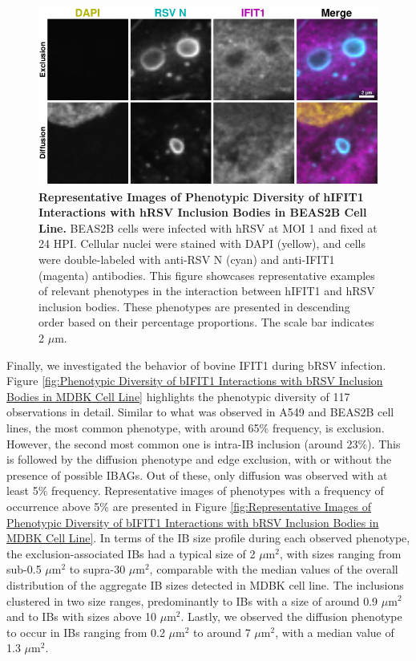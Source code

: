 \begin{figure}
    \centering
    \includegraphics[width=1\linewidth]{08. Chapter 3/Figs/02. Infection/01. IFIT1/06. beas2b i1.pdf}
    \caption[Representative Images of Phenotypic Diversity of hIFIT1 Interactions with hRSV Inclusion Bodies in BEAS2B Cell Line.]{\textbf{Representative Images of Phenotypic Diversity of hIFIT1 Interactions with hRSV Inclusion Bodies in BEAS2B Cell Line.} BEAS2B cells were infected with hRSV at MOI 1 and fixed at 24 HPI. Cellular nuclei were stained with DAPI (yellow), and cells were double-labeled with anti-RSV N (cyan) and anti-IFIT1 (magenta) antibodies. This figure showcases representative examples of relevant phenotypes in the interaction between hIFIT1 and hRSV inclusion bodies. These phenotypes are presented in descending order based on their percentage proportions. The scale bar indicates 2 \(\mu \mbox{m}\).}
    \label{fig:Representative Images of Phenotypic Diversity of hIFIT1 Interactions with hRSV Inclusion Bodies in BEAS2B Cell Line}
\end{figure}

Finally, we investigated the behavior of bovine IFIT1 during bRSV infection. Figure \ref{fig:Phenotypic Diversity of bIFIT1 Interactions with bRSV Inclusion Bodies in MDBK Cell Line} highlights the phenotypic diversity of 117 observations in detail. Similar to what was observed in A549 and BEAS2B cell lines, the most common phenotype, with around 65\% frequency, is exclusion. However, the second most common one is intra-IB inclusion (around 23\%). This is followed by the diffusion phenotype and edge exclusion, with or without the presence of possible IBAGs. Out of these, only diffusion was observed with at least 5\% frequency. Representative images of phenotypes with a frequency of occurrence above 5\% are presented in Figure \ref{fig:Representative Images of Phenotypic Diversity of bIFIT1 Interactions with bRSV Inclusion Bodies in MDBK Cell Line}. In terms of the IB size profile during each observed phenotype, the exclusion-associated IBs had a typical size of 2 \(\mu \mbox{m}^2\), with sizes ranging from sub-0.5 \(\mu \mbox{m}^2\) to supra-30 \(\mu \mbox{m}^2\), comparable with the median values of the overall distribution of the aggregate IB sizes detected in MDBK cell line. The inclusions clustered in two size ranges, predominantly to IBs with a size of around 0.9 \(\mu \mbox{m}^2\) and to IBs with sizes above 10 \(\mu \mbox{m}^2\). Lastly, we observed the diffusion phenotype to occur in IBs ranging from 0.2 \(\mu \mbox{m}^2\) to around 7 \(\mu \mbox{m}^2\), with a median value of 1.3 \(\mu \mbox{m}^2\).

